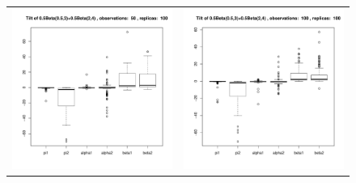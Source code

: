 \begin{figure}[h]
\begin{tabular}{cc}
\includegraphics[width=\textwidth/2]{../img/p05_a05_b3_p05_a2_b4/tilted/K2/bxplots/n50_R100.pdf}
&
\includegraphics[width=\textwidth/2]{../img/p05_a05_b3_p05_a2_b4/tilted/K2/bxplots/n100_R100.pdf}\\


\end{tabular}
\end{figure}
